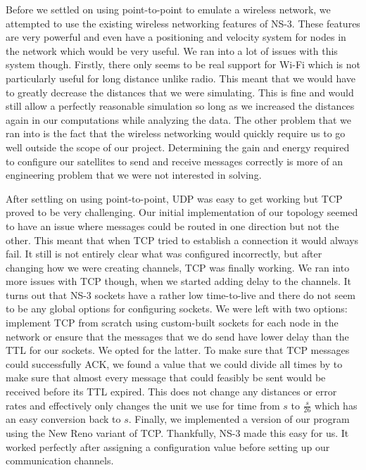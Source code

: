 \documentclass[a4paper,12pt]{article}
\begin{document}
Before we settled on using point-to-point to emulate a wireless network, we
attempted to use the existing wireless networking features of NS-3. These
features are very powerful and even have a positioning and velocity system for
nodes in the network which would be very useful. We ran into a lot of issues
with this system though. Firstly, there only seems to be real support for Wi-Fi
which is not particularly useful for long distance unlike radio. This meant that
we would have to greatly decrease the distances that we were simulating. This is
fine and would still allow a perfectly reasonable simulation so long as we
increased the distances again in our computations while analyzing the data. The
other problem that we ran into is the fact that the wireless networking would
quickly require us to go well outside the scope of our project. Determining the
gain and energy required to configure our satellites to send and receive
messages correctly is more of an engineering problem that we were not interested
in solving.

After settling on using point-to-point, UDP was easy to get working but TCP
proved to be very challenging. Our initial implementation of our topology seemed
to have an issue where messages could be routed in one direction but not the
other. This meant that when TCP tried to establish a connection it would always
fail. It still is not entirely clear what was configured incorrectly, but after
changing how we were creating channels, TCP was finally working. We ran into
more issues with TCP though, when we started adding delay to the channels. It
turns out that NS-3 sockets have a rather low time-to-live and there do not seem
to be any global options for configuring sockets. We were left with two options:
implement TCP from scratch using custom-built sockets for each node in the
network or ensure that the messages that we do send have lower delay than the
TTL for our sockets. We opted for the latter. To make sure that TCP messages
could successfully ACK, we found a value that we could divide all times by to
make sure that almost every message that could feasibly be sent would be
received before its TTL expired. This does not change any distances or error
rates and effectively only changes the unit we use for time from $s$ to
$\frac{s}{26}$ which has an easy conversion back to $s$. Finally, we implemented
a version of our program using the New Reno variant of TCP. Thankfully, NS-3
made this easy for us. It worked perfectly after assigning a configuration value
before setting up our communication channels.

\printbibliography{}
\end{document}
